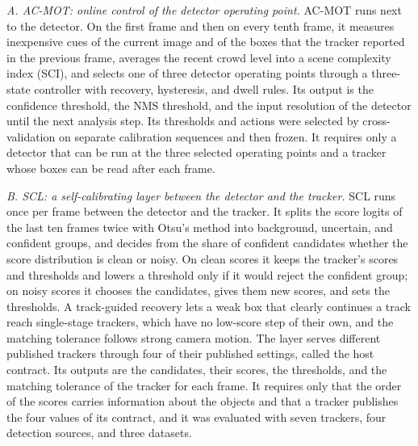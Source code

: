 \emph{A. AC-MOT: online control of the detector operating point.} AC-MOT runs next to the detector. On the first frame and then on every tenth frame, it measures inexpensive cues of the current image and of the boxes that the tracker reported in the previous frame, averages the recent crowd level into a scene complexity index (SCI), and selects one of three detector operating points through a three-state controller with recovery, hysteresis, and dwell rules. Its output is the confidence threshold, the NMS threshold, and the input resolution of the detector until the next analysis step. Its thresholds and actions were selected by cross-validation on separate calibration sequences and then frozen. It requires only a detector that can be run at the three selected operating points and a tracker whose boxes can be read after each frame.

\emph{B. SCL: a self-calibrating layer between the detector and the tracker.} SCL runs once per frame between the detector and the tracker. It splits the score logits of the last ten frames twice with Otsu's method \cite{goh2018otsu} into background, uncertain, and confident groups, and decides from the share of confident candidates whether the score distribution is clean or noisy. On clean scores it keeps the tracker's scores and thresholds and lowers a threshold only if it would reject the confident group; on noisy scores it chooses the candidates, gives them new scores, and sets the thresholds. A track-guided recovery lets a weak box that clearly continues a track reach single-stage trackers, which have no low-score step of their own, and the matching tolerance follows strong camera motion. The layer serves different published trackers through four of their published settings, called the host contract. Its outputs are the candidates, their scores, the thresholds, and the matching tolerance of the tracker for each frame. It requires only that the order of the scores carries information about the objects and that a tracker publishes the four values of its contract, and it was evaluated with seven trackers, four detection sources, and three datasets.

